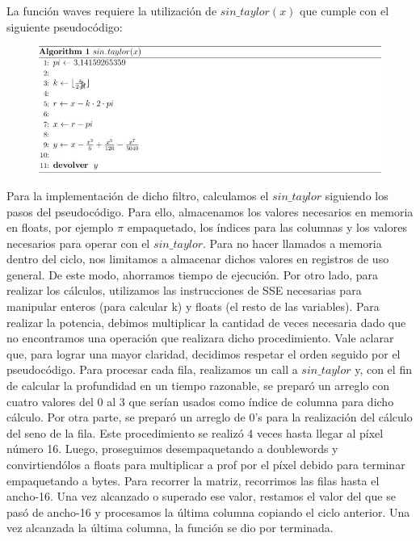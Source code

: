 \documentclass[10pt, a4paper]{article}
\begin{document}
\begin{itemize}
La función waves requiere la utilización de $sin\_taylor(x)$ que cumple con el siguiente pseudocódigo:
\begin{figure}[H] %
\begin{center}
\includegraphics[width=400pt]{./algoritmo_waves.jpg}
\end{center}
\end{figure}
Para la implementación de dicho filtro, calculamos el $sin\_taylor$ siguiendo los pasos del pseudocódigo. Para ello, almacenamos los valores necesarios en memoria en floats, por ejemplo $\pi$ empaquetado, los índices para las columnas y los valores necesarios para operar con el $sin\_taylor$. Para no hacer llamados a memoria dentro del ciclo, nos limitamos a almacenar dichos valores en registros de uso general. De este modo, ahorramos tiempo de ejecución. Por otro lado, para realizar los cálculos, utilizamos las instrucciones de SSE necesarias para manipular enteros (para calcular k) y floats (el resto de las variables). Para realizar la potencia, debimos multiplicar la cantidad de veces necesaria dado que no encontramos una operación que realizara dicho procedimiento. Vale aclarar que, para lograr una mayor claridad, decidimos respetar el orden seguido por el pseudocódigo.\newline
Para procesar cada fila, realizamos un call a $sin\_taylor$ y, con el fin de calcular la profundidad en un tiempo razonable, se preparó un arreglo con cuatro valores del 0 al 3 que serían usados como índice de columna para dicho cálculo. Por otra parte, se preparó un arreglo de 0's para la realización del cálculo del seno de la fila. Este procedimiento se realizó 4 veces hasta llegar al píxel número 16.\newline
Luego, proseguimos desempaquetando a doublewords y convirtiendólos a floats para multiplicar a prof por el píxel debido para terminar empaquetando a bytes.\newline
Para recorrer la matriz, recorrimos las filas hasta el ancho-16. Una vez alcanzado o superado ese valor, restamos el valor del que se pasó de ancho-16 y procesamos la última columna copiando el ciclo anterior. Una vez alcanzada la última columna, la función se dio por terminada.

\end{itemize}
\end{document}
